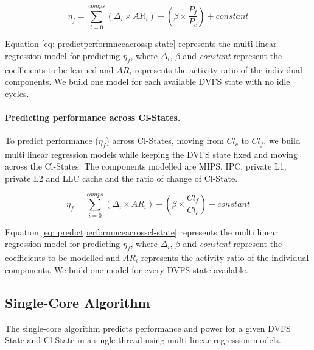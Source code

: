 \begin{equation}%
    \label{eq: predictperformnceacrossp-state}
    \eta_{\mathit{f}} = \sum_{i=0}^{comps}(\Delta_{\mathit{i}} \times AR_{\mathit{i}}) + (\beta \times \frac{P_{\mathit{f}}}{P_{\mathit{c}}}) + constant
\end{equation}

Equation \ref{eq: predictperformnceacrossp-state} represents the multi linear regression
model for predicting $\eta_\mathit{f}$, where $\Delta_\mathit{i}$, $\beta$ and
\textit{constant} represent the coefficients to be learned and {\it $AR_\mathit{i}$}
represents the activity ratio of the individual components. We build one model for each
available DVFS state with no idle cycles.


 \paragraph{Predicting performance across Cl-States.} To predict 
performance ($\eta_\mathit{f}$) across Cl-States, moving from $Cl_\mathit{c}$
to $Cl_\mathit{f}$, we build multi linear regression models while keeping the DVFS state
fixed and moving across the Cl-States. The components modelled are MIPS, IPC, private L1,
private L2 and LLC cache and the ratio of change of Cl-State.

\begin{equation}%
    \label{eq: predictperformnceacrosscl-state}
    \eta_{\mathit{f}} = \sum_{i=0}^{comps}(\Delta_{\mathit{i}} \times AR_{\mathit{i}}) + (\beta \times \frac{Cl_{\mathit{f}}}{Cl_{\mathit{c}}}) + constant
\end{equation}

 Equation \ref{eq: predictperformnceacrosscl-state} represents the multi linear regression
model for predicting $\eta_\mathit{f}$, where $\Delta_\mathit{i}$, $\beta$ and
\textit{constant} represent the coefficients to be modelled and \textit{$AR_\mathit{i}$}
represents the activity ratio of the individual components. We build one model for every
DVFS state available. 


\subsection{Single-Core Algorithm}
\label{subsec: algo}

The single-core algorithm predicts performance and power for a given DVFS State and Cl-State
in a single thread using multi linear regression models. 

